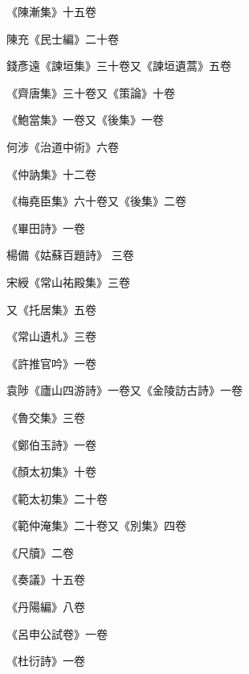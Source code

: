 \begin{pinyinscope}
 《陳漸集》十五卷



 陳充《民士編》二十卷



 錢彥遠《諫垣集》三十卷又《諫垣遺蒿》五卷



 《齊唐集》三十卷又《策論》十卷



 《鮑當集》一卷又《後集》一卷



 何涉《治道中術》六卷



 《仲訥集》十二卷



 《梅堯臣集》六十卷又《後集》二卷



 《畢田詩》一卷



 楊備《姑蘇百題詩》
 三卷



 宋綬《常山祐殿集》三卷



 又《托居集》五卷



 《常山遺札》三卷



 《許推官吟》一卷



 袁陟《廬山四游詩》一卷又《金陵訪古詩》一卷



 《魯交集》三卷



 《鄭伯玉詩》一卷



 《顏太初集》十卷



 《範太初集》二十卷



 《範仲淹集》二十卷又《別集》四卷



 《尺牘》二卷



 《奏議》十五卷



 《丹陽編》八卷



 《呂申公試卷》一卷



 《杜衍詩》一卷




\end{pinyinscope}
